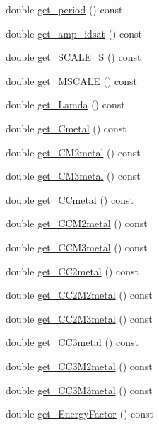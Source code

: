 \begin{DoxyCompactItemize}
\item 
double \hyperlink{classTechParameter_a9951de14242f50381b40667b4fe0ad25}{get\_\-period} () const 
\item 
double \hyperlink{classTechParameter_a2e07e540b5a06c5935908a4bcfbd597a}{get\_\-amp\_\-idsat} () const 
\item 
double \hyperlink{classTechParameter_a145ed0d2c7438ff32619d28abaa75ba1}{get\_\-SCALE\_\-S} () const 
\item 
double \hyperlink{classTechParameter_add77aef179c4c04d4ead2b9f955792ff}{get\_\-MSCALE} () const 
\item 
double \hyperlink{classTechParameter_a7240a705667eb6231fc3e84491d41484}{get\_\-Lamda} () const 
\item 
double \hyperlink{classTechParameter_affa834a7dcca1f0db5bfdf6a52743cd4}{get\_\-Cmetal} () const 
\item 
double \hyperlink{classTechParameter_a96be98ee648c067cb2fd65a8ed035df1}{get\_\-CM2metal} () const 
\item 
double \hyperlink{classTechParameter_a029e017ea98e5c9627bb53aab6f03f89}{get\_\-CM3metal} () const 
\item 
double \hyperlink{classTechParameter_a6c2db5ec524a7f29a81f535845198e38}{get\_\-CCmetal} () const 
\item 
double \hyperlink{classTechParameter_a65726505c9313832b3717bdda41ba73b}{get\_\-CCM2metal} () const 
\item 
double \hyperlink{classTechParameter_a1e2db506b866ee12fd2542fcb1381593}{get\_\-CCM3metal} () const 
\item 
double \hyperlink{classTechParameter_a3a3ddc4ac55983c4dde587e21ee96cd4}{get\_\-CC2metal} () const 
\item 
double \hyperlink{classTechParameter_ad71175b50d05e7d906fdb0fba379916a}{get\_\-CC2M2metal} () const 
\item 
double \hyperlink{classTechParameter_a087e2078fed843d7abf4ada6b39f9cf9}{get\_\-CC2M3metal} () const 
\item 
double \hyperlink{classTechParameter_a3d8b84f46e39b9dd770c3288aa1ee94b}{get\_\-CC3metal} () const 
\item 
double \hyperlink{classTechParameter_acc7075f86c5c3d42dc26146459e92d6e}{get\_\-CC3M2metal} () const 
\item 
double \hyperlink{classTechParameter_a472e5bc10baf89389967e0ecf5b2f16c}{get\_\-CC3M3metal} () const 
\item 
double \hyperlink{classTechParameter_a57f2d419b08753b3e34e637950838b9a}{get\_\-EnergyFactor} () const 

\end{DoxyCompactItemize}

